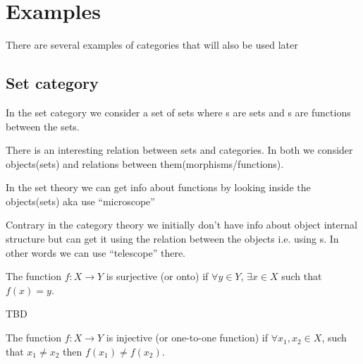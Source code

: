 \section{Examples}

There are several examples of categories that will also be used later

\subsection{\textbf{Set} category}
\begin{example}
\label{ex:setcategory}
In the set category we consider a set of sets where
s are sets and s are
functions between the sets. 
\end{example}

\begin{remark}
\label{rem:set_vs_category}
There is an interesting relation between sets and categories. In both
we consider objects(sets) and relations between
them(morphisms/functions). 

In the set theory we can get info about functions by looking inside
the objects(sets) aka use ``microscope'' \cite{bib:milewski2018category} 

Contrary in the category theory we initially don't have info about object
internal structure but can get it using the relation between the
objects i.e. using s. In other words we can use
``telescope'' \cite{bib:milewski2018category}  there.
\end{remark}

\begin{definition}[Surjection]
  \label{def:surjection}
  The function $f: X \rightarrow Y$ is surjective (or onto) if
  $\forall y \in Y$, $\exists x \in X$ such that
  $f\left(x\right) = y$.
\end{definition}

\begin{remark}
\label{rem:surjection_epimorphism}
TBD
\end{remark}

\begin{definition}[Injection]
  \label{def:injection}
  The function $f: X \rightarrow Y$ is injective (or one-to-one function) if
  $\forall x_1, x_2 \in X$, such that $x_1 \ne x_2$ then
  $f\left(x_1\right) \ne f\left(x_2\right)$.
\end{definition}

